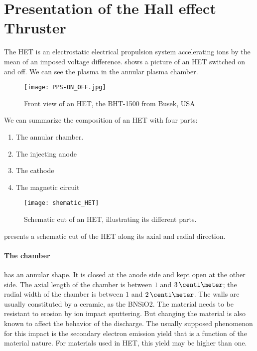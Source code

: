 

\section*{Presentation of the Hall effect Thruster }
  \label{sec-HET}

  
  The \ac{HET} is an electrostatic electrical propulsion system accelerating ions by the mean of an imposed voltage difference.
   shows a picture of an \ac{HET} switched on and off.
  We can see the plasma in the annular plasma chamber.


  \begin{figure}[hbt]
    \centering
    \texttt{[image: PPS-ON\_OFF.jpg]}
    \caption{Front view of an \acs{HET}, the BHT-1500 from Busek, USA}
    \label{fig-bhtonoff}
  \end{figure}

  We can summarize the composition of an \ac{HET} with four parts\string:
  \begin{enumerate}
    \item The annular chamber.
    \item The injecting anode
    \item The cathode
    \item The magnetic circuit
  \end{enumerate}

  \begin{figure}[hbt]
    \centering
    \texttt{[image: shematic\_HET]}
    \caption{Schematic cut of an \acs{HET}, illustrating its different parts. }
    \label{fig-shematiccut}
  \end{figure}

   presents a schematic cut of the \ac{HET} along its axial and radial direction.

  \paragraph{The chamber} has an annular shape.
  It is closed at the anode side and kept open at the other side.
  The axial length of the chamber is between $1$ and $3\,\centi\meter$; the radial width of the chamber is between $1$ and $2\,\centi\meter$. 
  The walls are usually constituted by a ceramic, as the \ac{BNSiO2}.
  The material needs to be resistant to erosion by ion impact sputtering.
  But changing the material is also known to affect the behavior of the discharge.
  The usually supposed phenomenon for this impact is the secondary electron emission yield that is a function of the material nature.
  For materials used in HET, this yield may be higher than one.


